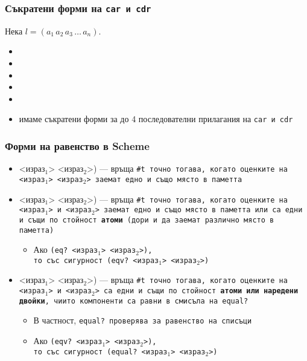 \documentclass{beamer}
\begin{document}
\begin{frame}
  \frametitle{Съкратени форми на \tt{car} и \tt{cdr}}

  Нека $l = (a_1\,a_2\,a_3\,\ldots\,a_n)$.
  \begin{itemize}[<+->]
  \item {}
  \item {}
  \item {}
  \item {}
  \item {}
  \item имаме съкратени форми за до 4 последователни прилагания на \tt{car} и \tt{cdr}
  \end{itemize}
\end{frame}

\begin{frame}
  \frametitle{Форми на равенство в Scheme}

  \begin{itemize}[<+->]
  \item {}<израз$_1$> <израз$_2$>\tta) --- връща \tt{\#t} точно тогава, когато оценките на <израз$_1$> <израз$_2$> заемат едно и също място в паметта
  \item {}<израз$_1$> <израз$_2$>\tta) --- връща \tt{\#t} точно тогава, когато оценките на <израз$_1$> и <израз$_2$> заемат едно и също място в паметта или са едни и същи по стойност \textbf{атоми} (дори и да заемат различно място в паметта)
    \begin{itemize}
    \item Ако \tt{(eq? }<израз$_1$> <израз$_2$>\tt),\\
      то със сигурност \tt{(eqv? }<израз$_1$> <израз$_2$>\tt)
    \end{itemize}
  \item {}<израз$_1$> <израз$_2$>\tta) --- връща \tt{\#t} точно тогава, когато оценките на <израз$_1$> и <израз$_2$> са едни и същи по стойност \textbf{атоми или наредени двойки}, чиито компоненти са равни в смисъла на \tt{equal?}
    \begin{itemize}
    \item В частност, \tt{equal?} проверява за равенство на списъци
    \item Ако \tt{(eqv? }<израз$_1$> <израз$_2$>\tt),\\
      то със сигурност \tt{(equal? }<израз$_1$> <израз$_2$>\tt)
    \end{itemize}
  \end{itemize}
\end{frame}
\end{document}

